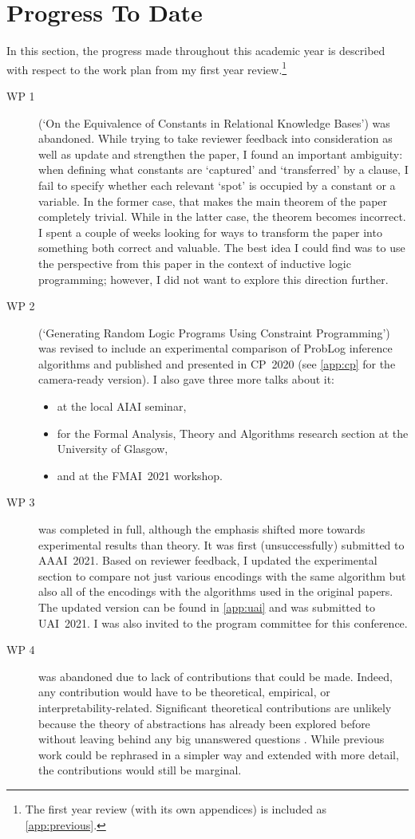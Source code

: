 \documentclass{article}
\begin{document}
\section{Progress To Date} \label{sec:progress}

In this section, the progress made throughout this academic year is described
with respect to the work plan from my first year review.\footnote{The first year
review (with its own appendices) is included as \cref{app:previous}.}

\begin{description}
\item[WP 1] (`On the Equivalence of Constants in Relational Knowledge Bases')
  was abandoned. While trying to take reviewer feedback into consideration as
  well as update and strengthen the paper, I found an important ambiguity: when
  defining what constants are `captured' and `transferred' by a clause, I fail
  to specify whether each relevant `spot' is occupied by a constant or a
  variable. In the former case, that makes the main theorem of the paper
  completely trivial. While in the latter case, the theorem becomes incorrect. I
  spent a couple of weeks looking for ways to transform the paper into something
  both correct and valuable. The best idea I could find was to use the
  perspective from this paper in the context of inductive logic programming;
  however, I did not want to explore this direction further.
\item[WP 2] (`Generating Random Logic Programs Using Constraint
  Programming') was revised to include an experimental comparison of ProbLog
  inference algorithms and published and presented in CP~2020 (see \cref{app:cp}
  for the camera-ready version). I also gave three more talks about it:
  \begin{itemize}
  \item at the local AIAI seminar,
  \item for the Formal Analysis, Theory and Algorithms research section at the
    University of Glasgow,
  \item and at the FMAI~2021 workshop.
  \end{itemize}
\item[WP 3] was completed in full, although the emphasis shifted more towards
  experimental results than theory. It was first (unsuccessfully) submitted to
  AAAI~2021. Based on reviewer feedback, I updated the experimental section to
  compare not just various encodings with the same algorithm but also all of the
  encodings with the algorithms used in the original papers. The updated version
  can be found in \cref{app:uai} and was submitted to UAI~2021. I was also
  invited to the program committee for this conference.
\item[WP 4] was abandoned due to lack of contributions that could be made.
  Indeed, any contribution would have to be theoretical, empirical, or
  interpretability-related. Significant theoretical contributions are unlikely
  because the theory of abstractions has already been explored before without
  leaving behind any big unanswered questions \cite{DBLP:journals/kbs/Belle20}.
  While previous work could be rephrased in a simpler way and extended with more
  detail, the contributions would still be marginal.


\end{description}
\end{document}
